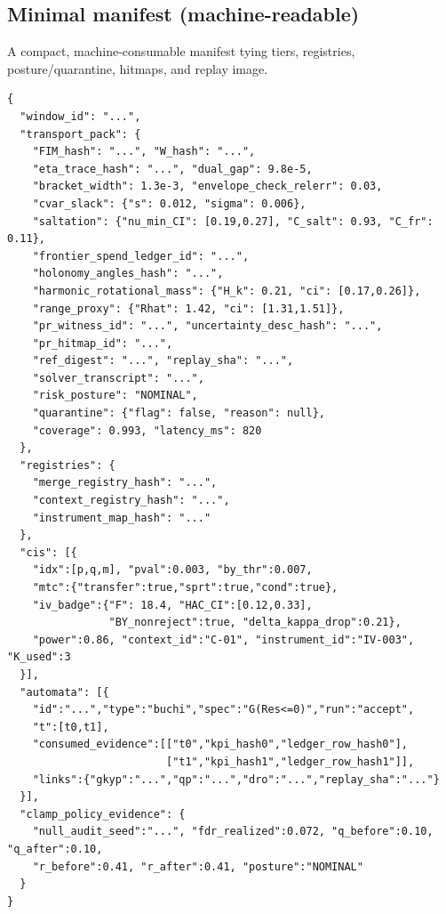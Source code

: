 \subsection{Minimal manifest (machine-readable)}
\noindent A compact, machine-consumable manifest tying tiers, registries, posture/quarantine, hitmaps, and replay image.
\begin{lstlisting}
{
  "window_id": "...",
  "transport_pack": {
    "FIM_hash": "...", "W_hash": "...",
    "eta_trace_hash": "...", "dual_gap": 9.8e-5,
    "bracket_width": 1.3e-3, "envelope_check_relerr": 0.03,
    "cvar_slack": {"s": 0.012, "sigma": 0.006},
    "saltation": {"nu_min_CI": [0.19,0.27], "C_salt": 0.93, "C_fr": 0.11},
    "frontier_spend_ledger_id": "...",
    "holonomy_angles_hash": "...",
    "harmonic_rotational_mass": {"H_k": 0.21, "ci": [0.17,0.26]},
    "range_proxy": {"Rhat": 1.42, "ci": [1.31,1.51]},
    "pr_witness_id": "...", "uncertainty_desc_hash": "...",
    "pr_hitmap_id": "...",
    "ref_digest": "...", "replay_sha": "...",
    "solver_transcript": "...",
    "risk_posture": "NOMINAL",
    "quarantine": {"flag": false, "reason": null},
    "coverage": 0.993, "latency_ms": 820
  },
  "registries": {
    "merge_registry_hash": "...",
    "context_registry_hash": "...",
    "instrument_map_hash": "..."
  },
  "cis": [{
    "idx":[p,q,m], "pval":0.003, "by_thr":0.007,
    "mtc":{"transfer":true,"sprt":true,"cond":true},
    "iv_badge":{"F": 18.4, "HAC_CI":[0.12,0.33],
                "BY_nonreject":true, "delta_kappa_drop":0.21},
    "power":0.86, "context_id":"C-01", "instrument_id":"IV-003", "K_used":3
  }],
  "automata": [{
    "id":"...","type":"buchi","spec":"G(Res<=0)","run":"accept",
    "t":[t0,t1],
    "consumed_evidence":[["t0","kpi_hash0","ledger_row_hash0"],
                         ["t1","kpi_hash1","ledger_row_hash1"]],
    "links":{"gkyp":"...","qp":"...","dro":"...","replay_sha":"..."}
  }],
  "clamp_policy_evidence": {
    "null_audit_seed":"...", "fdr_realized":0.072, "q_before":0.10, "q_after":0.10,
    "r_before":0.41, "r_after":0.41, "posture":"NOMINAL"
  }
}
\end{lstlisting}

